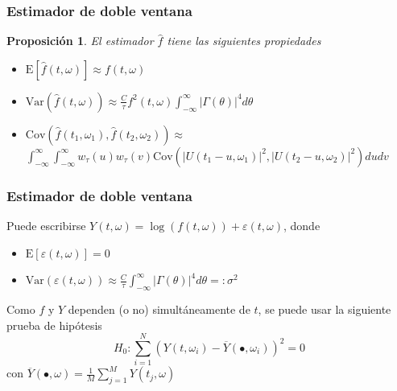 \documentclass[serif,mathserif,professionalfont]{beamer}
\newtheorem{proposicion}{Proposición}
\newcommand{\intR}{\int_{-\infty}^{\infty}}
\newcommand{\est}[1]{\widehat{ #1 }}
\newcommand{\E}[1]{\mathrm{E}\left[ #1 \right]}
\newcommand{\Var}[1]{\mathrm{Var}\left( #1 \right)}
\newcommand{\Cov}[1]{\mathrm{Cov}\left( #1 \right)}
\newcommand{\abso}[1]{\left| #1 \right|}
\begin{document}

\begin{frame}\frametitle{Estimador de doble ventana}
\begin{proposicion}
El estimador $\widehat{f}$ tiene las siguientes propiedades
\begin{itemize}
\item $\displaystyle \E{\est{f}(t,\omega)} \approx f(t,\omega)$
\item $\displaystyle \Var{\est{f}(t,\omega)} \approx 
\frac{C}{\tau} f^{2}(t,\omega) \intR \abso{\Gamma (\theta)}^{4} d\theta$
\item $\displaystyle \Cov{\est{f}(t_1,\omega_1) , \est{f}(t_2,\omega_2)} \approx $
{\small $\intR \intR
w_\tau (u) w_\tau(v) \Cov{ \abso{U(t_1-u,\omega_1)}^{2} , \abso{U(t_2-u,\omega_2)}^{2} } du dv$
}
\end{itemize}
\end{proposicion}
\end{frame}


\begin{frame}\frametitle{Estimador de doble ventana}
Puede escribirse
$Y(t,\omega) = \log \left( f(t,\omega) \right) + \varepsilon(t,\omega)$, 
donde 
\begin{itemize}
\item $\displaystyle \E{\varepsilon(t,\omega)} = 0$
\item $\displaystyle \Var{\varepsilon(t,\omega)}
\approx \frac{C}{\tau} \intR \abso{\Gamma (\theta)}^{4} d\theta =: \sigma^{2}$
\end{itemize}

Como $f$ y $Y$  dependen (o no) simultáneamente de $t$, se puede usar 
la siguiente prueba de hipótesis
\begin{equation*}
H_0 : \sum_{i = 1 }^{N} \left( Y(t,\omega_i) - \overline{Y}(\bullet,\omega_i) \right)^{2} 
= 0
\end{equation*}
con $\overline{Y}(\bullet,\omega) = \frac{1}{M} \sum_{j=1}^{M} Y(t_j,\omega)$
\end{frame}

\end{document}
